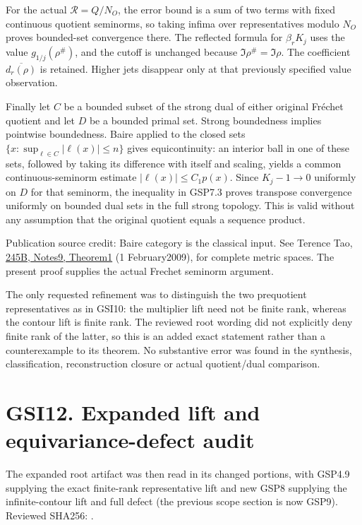 For the actual \(\mathcal R=Q/N_O\), the error bound is a sum of two
terms with fixed continuous quotient seminorms, so taking infima over
representatives modulo \(N_O\) proves bounded-set convergence there. The
reflected formula for \(\beta_rK_j\) uses the value
\(g_{1/j}(\rho^\#)\), and the cutoff is unchanged because
\(\Im\rho^\#=\Im\rho\). The coefficient \(\overline{d_r(\rho)}\) is
retained. Higher jets disappear only at that previously specified value
observation.

Finally let \(C\) be a bounded subset of the strong dual of either
original Fréchet quotient and let \(D\) be a bounded primal set. Strong
boundedness implies pointwise boundedness. Baire applied to the closed
sets \(\{x:\sup_{\ell\in C}|\ell(x)|\le n\}\) gives equicontinuity: an
interior ball in one of these sets, followed by taking its difference
with itself and scaling, yields a common continuous-seminorm estimate
\(|\ell(x)|\le C_1p(x)\). Since \(K_j-1\to0\) uniformly on \(D\) for
that seminorm, the inequality in GSP7.3 proves transpose convergence
uniformly on bounded dual sets in the full strong topology. This is
valid without any assumption that the original quotient equals a
sequence product.

Publication source credit: Baire category is the classical input. See
Terence Tao,
\href{https://terrytao.wordpress.com/2009/02/01/245b-notes-9-the-baire-category-theorem-and-its-banach-space-consequences/}{245B,
Notes9, Theorem1} (1 February2009), for complete metric spaces. The
present proof supplies the actual Frechet seminorm argument.

The only requested refinement was to distinguish the two prequotient
representatives as in GSI10: the multiplier lift need not be finite
rank, whereas the contour lift is finite rank. The reviewed root wording
did not explicitly deny finite rank of the latter, so this is an added
exact statement rather than a counterexample to its theorem. No
substantive error was found in the synthesis, classification,
reconstruction closure or actual quotient/dual comparison.

\section{GSI12. Expanded lift and equivariance-defect
audit}\label{gsi12.-expanded-lift-and-equivariance-defect-audit}

The expanded root artifact was then read in its changed portions, with
GSP4.9 supplying the exact finite-rank representative lift and new GSP8
supplying the infinite-contour lift and full defect (the previous scope
section is now GSP9). Reviewed SHA256:
.

